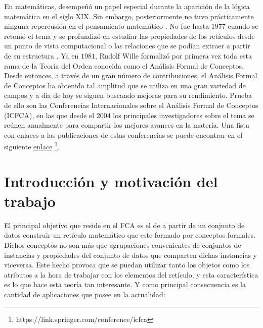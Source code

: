 \documentclass[oneside,openright,titlepage,numbers=noenddot,openany,headinclude,footinclude=true,
cleardoublepage=empty,abstractoff,BCOR=5mm,paper=a4,fontsize=12pt,main=spanish]{scrreprt}
\begin{document}
En matemáticas, desempeñó un papel especial durante la aparición de la lógica matemática en el siglo XIX. Sin embargo, posteriormente no tuvo prácticamente ninguna repercusión en el pensamiento matemático \cite{comparingperformance}. No fue hasta $1977$ cuando se retomó el tema y se profundizó en estudiar las propiedades de los retículos desde un punto de vista computacional \cite{distributive} o las relaciones que se podían extraer a partir de su estructura \cite{tolerance}. Ya en $1981$, Rudolf Wille \cite{willeconcept} formalizó por primera vez toda esta rama de la Teoría del Orden conocida como el Análisis Formal de Conceptos. Desde entonces, a través de un gran número de contribuciones, el Análisis Formal de Conceptos ha obtenido tal amplitud que se utiliza en una gran variedad de campos y a día de hoy se siguen buscando mejoras para su rendimiento. Prueba de ello son las Conferencias Internacionales sobre el Análisis Formal de Conceptos (ICFCA), en las que desde el $2004$ los principales investigadores sobre el tema se reúnen anualmente para compartir los mejores avances en la materia. Una lista con enlaces a las publicaciones de estas conferencias se puede encontrar en el siguiente \href{https://link.springer.com/conference/icfca}{enlace} \footnote{https://link.springer.com/conference/icfca}.

\section{Introducción y motivación del trabajo}

El principal objetivo que reside en el FCA es el de a partir de un conjunto de datos construir un retículo matemático que este formado por conceptos formales. Dichos conceptos no son más que agrupaciones convenientes de conjuntos de instancias y propiedades del conjunto de datos que comparten dichas instancias y viceversa. Este hecho provoca que se puedan utilizar tanto los objetos como los atributos a la hora de trabajar con los elementos del retículo, y esta característica es lo que hace esta teoría tan interesante.  Y como principal consecuencia es la cantidad de aplicaciones que posee en la actualidad:
\end{document}
